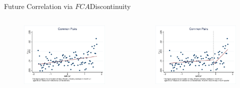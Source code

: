 \documentclass{beamer}
\begin{document}
	\begin{frame}{ Future Correlation via $ FCA $}{Discontinuity}\label{Monthly5}
		
		
		
		
		
		\begin{columns}
			\begin{figure}   
				\centering
				\includegraphics[width=\linewidth]{"Output/mcorr5l.eps"}     \end{figure}            
			\begin{figure}
				\centering  
				\includegraphics[width=\linewidth]{"Output/Qmcorr5lrd.eps"}
			\end{figure}
		\end{columns}
		\centering
		
		
	\end{frame}
	
\end{document}
